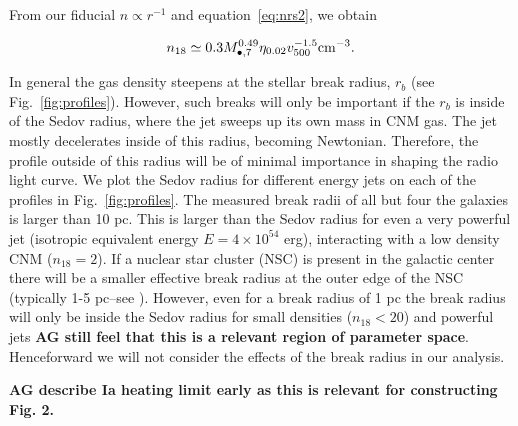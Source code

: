 \documentclass[usenatbib,fleqn]{mnras}
\newcommand{\Mbh}[1][]{M_{\bullet#1}}
\begin{document}
From our fiducial $n\propto r^{-1}$ and equation~\eqref{eq:nrs2}, we
obtain

\begin{equation}
n_{18}\simeq 0.3 \Mbh[,7]^{0.49} \eta_{0.02} v_{500}^{-1.5} {\rm
  cm^{-3}}.
\label{eq:n18}
\end{equation} 


In general the gas density steepens at the stellar break radius, $r_b$
(see Fig.~\ref{fig:profiles}). However, such breaks will only be
important if the $r_b$ is inside of the Sedov radius, where the jet
sweeps up its own mass in CNM gas.  The jet mostly decelerates inside
of this radius, becoming Newtonian. Therefore, the profile outside of
this radius will be of minimal importance in shaping the radio
light curve. We plot the Sedov radius for different energy jets on
each of the profiles in Fig.~\ref{fig:profiles}. The measured break
radii of all but four the \citet{Lauer+2007} galaxies is larger than
10 pc. This is larger than the Sedov radius for even a very powerful
jet (isotropic equivalent energy $E=4\times 10^{54}$ erg), interacting
with a low density CNM ($n_{18}=2$). If a nuclear star cluster (NSC)
is present in the galactic center there will be a smaller effective
break radius at the outer edge of the NSC (typically 1-5 pc--see
\citealt{Georgiev+2014}). However, even for a break radius of 1 pc the
break radius will only be inside the Sedov radius for small densities
($n_{18}<20$) and powerful jets {\bf AG still feel that this is a
  relevant region of parameter space}. Henceforward we will not
consider the effects of the break radius in our analysis.

{\bf AG describe Ia heating limit early as this is
  relevant for constructing Fig. 2.}
\end{document}
